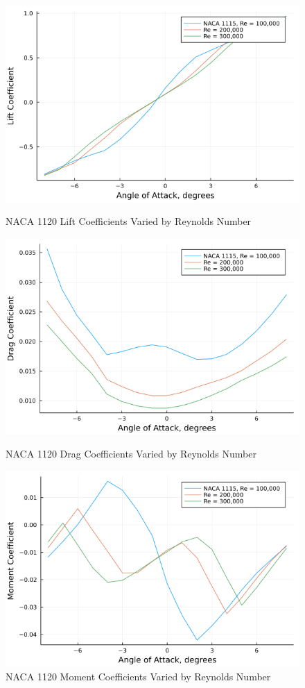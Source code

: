 \documentclass{article}
\begin{document}
\begin{figure}[!htb]
  \includegraphics[width=\linewidth]{Figure10.png}
  \caption{NACA 1120 Lift Coefficients Varied by Reynolds Number}\label{fig:10}
\endminipage\hfill
{}
  \includegraphics[width=\linewidth]{Figure11.png}
  \caption{NACA 1120 Drag Coefficients Varied by Reynolds Number}\label{fig:11}
\endminipage\hfill
{}
  \includegraphics[width=\linewidth]{Figure12.png}
  \caption{NACA 1120 Moment Coefficients Varied by Reynolds Number}\label{fig:12}
\endminipage
\end{figure}
\end{document}
